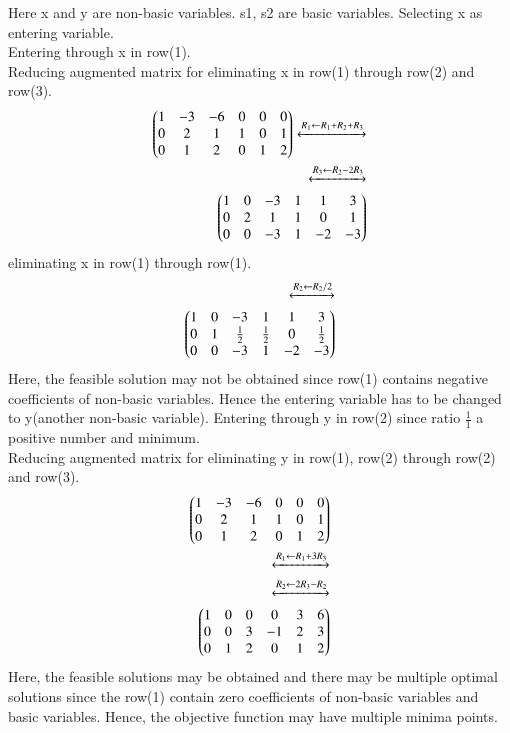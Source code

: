 \documentclass[journal,12pt,twocolumn]{IEEEtran}
\begin{document}
Here x and y are non-basic variables. s1, s2 are basic variables. Selecting x as entering variable.\\
Entering through x in row(1).\\
Reducing augmented matrix for eliminating x in row(1) through row(2) and row(3).
\begin{align}
\begin{pmatrix}1 & -3 & -6 & 0 & 0 & 0\\0 & 2 & 1 & 1 & 0 & 1\\0 & 1 & 2 & 0 & 1 & 2\end{pmatrix}
\xleftrightarrow[]{R_1 \leftarrow {R_1+R_2+R_3}}\\
\xleftrightarrow[]{R_3 \leftarrow {R_2-2R_3}}\\
\begin{pmatrix}1 & 0 & -3 & 1 & 1 & 3\\0 & 2 & 1 & 1 & 0 & 1\\0 & 0 & -3 & 1 & -2 & -3\end{pmatrix}
\end{align}
eliminating x in row(1) through row(1).
\begin{align}
\xleftrightarrow[]{R_2 \leftarrow {R_2/2}}\\
\begin{pmatrix}1 & 0 & -3 & 1 & 1 & 3\\0 & 1 & \frac{1}{2} & \frac{1}{2} & 0 & \frac{1}{2}\\0 & 0 & -3 & 1 & -2 & -3\end{pmatrix}
\end{align}
Here, the feasible solution may not be obtained since row(1) contains negative coefficients of non-basic variables. Hence the entering variable has to be changed to y(another non-basic variable).
Entering through y in row(2) since ratio $\frac{1}{1}$ a positive number and minimum.\\
Reducing augmented matrix for eliminating y in row(1), row(2) through row(2) and row(3).
\begin{align}
\begin{pmatrix}1 & -3 & -6 & 0 & 0 & 0\\0 & 2 & 1 & 1 & 0 & 1\\0 & 1 & 2 & 0 & 1 & 2\end{pmatrix}\\
\xleftrightarrow[]{R_1 \leftarrow {R_1+3R_3}}\\
\xleftrightarrow[]{R_2 \leftarrow {2R_3-R_2}}\\
\begin{pmatrix}1 & 0 & 0 & 0 & 3 & 6\\0 & 0 & 3 & -1 & 2 & 3\\0 & 1 & 2 & 0 & 1 & 2\end{pmatrix}
\end{align}
Here, the feasible solutions may be obtained and there may be multiple optimal solutions since the row(1) contain zero coefficients of non-basic variables and basic variables. Hence, the objective function may have multiple minima points.
\end{document}
